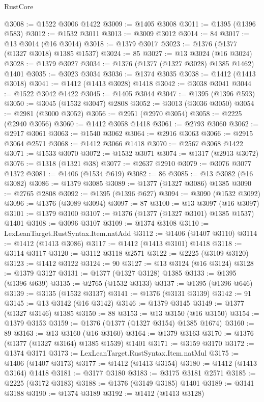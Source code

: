 \begin{lexlean}{RustCore}
\begin{coremodule}
@3008 := @1522 @3006 @1422
@3009 := @1405 @3008
@3011 := @1395 (@1396 @583)
@3012 := @1532 @3011
@3013 := @3009 @3012
@3014 := 84
@3017 := @13 @3014 (@16 @3014)
@3018 := @1379 @3017
@3023 := @1376 (@1377 (@1327 @3018) @1385 @1537)
@3024 := 85
@3027 := @13 @3024 (@16 @3024)
@3028 := @1379 @3027
@3034 := @1376 (@1377 (@1327 @3028) @1385 @1462) @1401
@3035 := @3023 @3034
@3036 := @1374 @3035
@3038 := @1412 (@1413 @3018)
@3041 := @1412 (@1413 @3028) @1418
@3042 := @3038 @3041
@3044 := @1522 @3042 @1422
@3045 := @1405 @3044
@3047 := @1395 (@1396 @593)
@3050 := @3045 (@1532 @3047) @2808
@3052 := @3013 (@3036 @3050)
@3054 := @2981 (@3000 @3052)
@3056 := @2951 (@2970 @3054)
@3058 := @2225 (@2940 @3056)
@3060 := @1412 @3058 @1418
@3061 := @2793 @3060
@3062 := @2917 @3061
@3063 := @1540 @3062
@3064 := @2916 @3063
@3066 := @2915 @3064 @2571
@3068 := @1412 @3066 @1418
@3070 := @2567 @3068 @1422
@3071 := @1533 @3070
@3072 := @1532 @3071
@3074 := @1317 (@2913 @3072)
@3076 := @1318 (@1321 @38)
@3077 := @2637 @2910
@3079 := @3076 @3077 @1372
@3081 := @1406 (@1534 @619)
@3082 := 86
@3085 := @13 @3082 (@16 @3082)
@3086 := @1379 @3085
@3089 := @1377 (@1327 @3086) @1385
@3090 := @2765 @2808
@3092 := @1395 (@1396 @627)
@3094 := @3090 (@1532 @3092)
@3096 := @1376 (@3089 @3094)
@3097 := 87
@3100 := @13 @3097 (@16 @3097)
@3101 := @1379 @3100
@3107 := @1376 (@1377 (@1327 @3101) @1385 @1537) @1401
@3108 := @3096 @3107
@3109 := @1374 @3108
@3110 := LexLeanTarget.RustSyntax.Item.natAdd
@3112 := @1406 (@1407 @3110)
@3114 := @1412 (@1413 @3086)
@3117 := @1412 (@1413 @3101) @1418
@3118 := @3114 @3117
@3120 := @3112 @3118 @2571
@3122 := @2225 (@3109 @3120)
@3123 := @1412 @3122
@3124 := 90
@3127 := @13 @3124 (@16 @3124)
@3128 := @1379 @3127
@3131 := @1377 (@1327 @3128) @1385
@3133 := @1395 (@1396 @639)
@3135 := @2765 (@1532 @3133)
@3137 := @1395 (@1396 @646)
@3139 := @3135 (@1532 @3137)
@3141 := @1376 (@3131 @3139)
@3142 := 91
@3145 := @13 @3142 (@16 @3142)
@3146 := @1379 @3145
@3149 := @1377 (@1327 @3146) @1385
@3150 := 88
@3153 := @13 @3150 (@16 @3150)
@3154 := @1379 @3153
@3159 := @1376 (@1377 (@1327 @3154) @1385 @1674)
@3160 := 89
@3163 := @13 @3160 (@16 @3160)
@3164 := @1379 @3163
@3170 := @1376 (@1377 (@1327 @3164) @1385 @1539) @1401
@3171 := @3159 @3170
@3172 := @1374 @3171
@3173 := LexLeanTarget.RustSyntax.Item.natMul
@3175 := @1406 (@1407 @3173)
@3177 := @1412 (@1413 @3154)
@3180 := @1412 (@1413 @3164) @1418
@3181 := @3177 @3180
@3183 := @3175 @3181 @2571
@3185 := @2225 (@3172 @3183)
@3188 := @1376 (@3149 @3185) @1401
@3189 := @3141 @3188
@3190 := @1374 @3189
@3192 := @1412 (@1413 @3128)

\end{coremodule}
\end{lexlean}

